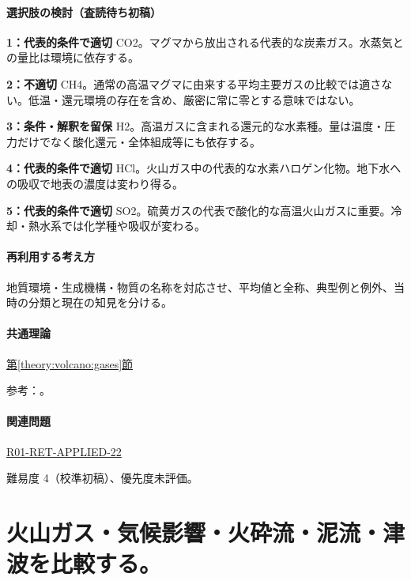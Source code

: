 \paragraph{選択肢の検討（査読待ち初稿）}\mbox{}\par

\noindent\textbf{1：代表的条件で適切} CO2。マグマから放出される代表的な炭素ガス。水蒸気との量比は環境に依存する。\par

\noindent\textbf{2：不適切} CH4。通常の高温マグマに由来する平均主要ガスの比較では適さない。低温・還元環境の存在を含め、厳密に常に零とする意味ではない。\par

\noindent\textbf{3：条件・解釈を留保} H2。高温ガスに含まれる還元的な水素種。量は温度・圧力だけでなく酸化還元・全体組成等にも依存する。\par

\noindent\textbf{4：代表的条件で適切} HCl。火山ガス中の代表的な水素ハロゲン化物。地下水への吸収で地表の濃度は変わり得る。\par

\noindent\textbf{5：代表的条件で適切} SO2。硫黄ガスの代表で酸化的な高温火山ガスに重要。冷却・熱水系では化学種や吸収が変わる。\par

\paragraph{再利用する考え方} 地質環境・生成機構・物質の名称を対応させ、平均値と全称、典型例と例外、当時の分類と現在の知見を分ける。

\paragraph{共通理論} \hyperref[theory:volcano:gases]{第\ref*{theory:volcano:gases}節}

\par 参考：\cite{vol50_gas_ref}。

\paragraph{関連問題} \hyperref[q:r01-ret-applied-22]{R01-RET-APPLIED-22}

\par 難易度 4（校準初稿）、優先度未評価。

\section{火山ガス・気候影響・火砕流・泥流・津波を比較する。}

